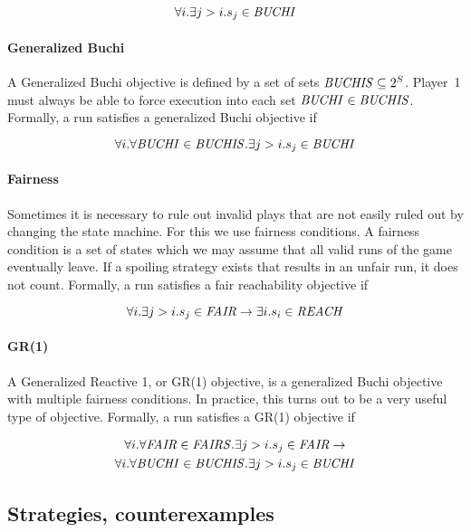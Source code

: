 \begin{equation}
\forall i. \exists j>i. s_j \in \mathit{BUCHI}
\end{equation}

\paragraph{Generalized Buchi}
A Generalized Buchi objective is defined by a set of sets $\mathit{BUCHIS} \subseteq 2^S$. Player~1 must always be able to force execution into each set $\mathit{BUCHI} \in \mathit{BUCHIS}$. Formally, a run satisfies a generalized Buchi objective if 

\begin{equation}
\forall i. \forall \mathit{BUCHI} \in \mathit{BUCHIS}. \exists j>i. s_j \in \mathit{BUCHI}
\end{equation}

\paragraph{Fairness}
Sometimes it is necessary to rule out invalid plays that are not easily ruled out by changing the state machine. For this we use fairness conditions. A fairness condition is a set of states which we may assume that all valid runs of the game eventually leave. If a spoiling strategy exists that results in an unfair run, it does not count. Formally, a run satisfies a fair reachability objective if 

\begin{equation}
\forall i. \exists j>i. s_j \in \mathit{FAIR} \rightarrow \exists i. s_i \in \mathit{REACH}
\end{equation}

\paragraph{GR(1)}
A Generalized Reactive 1, or GR(1) \cite{gr1} objective, is a generalized Buchi objective with multiple fairness conditions. In practice, this turns out to be a very useful type of objective. Formally, a run satisfies a GR(1) objective if 

\begin{multline}
\forall i. \forall \mathit{FAIR} \in \mathit{FAIRS}. \exists j>i. s_j \in \mathit{FAIR} \rightarrow \\ \forall i. \forall \mathit{BUCHI} \in \mathit{BUCHIS}. \exists j>i. s_j \in \mathit{BUCHI}
\end{multline}

\subsection{Strategies, counterexamples}

